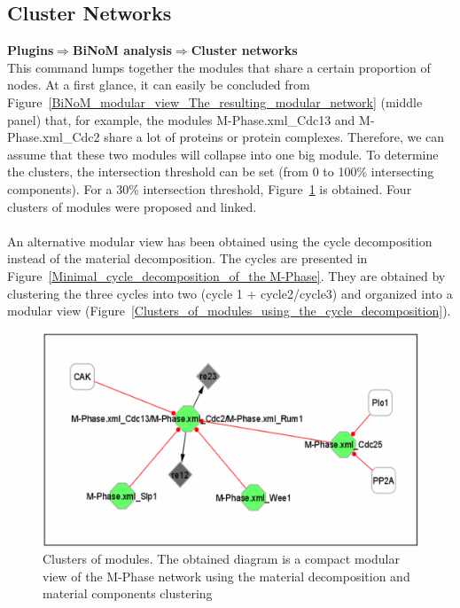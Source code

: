\subsection{Cluster Networks}
\textbf{Plugins$\Rightarrow$BiNoM analysis$\Rightarrow$Cluster networks}\\
This command lumps together the modules that share a certain proportion of nodes. At a first glance, it can easily be concluded from Figure~\ref{BiNoM_modular_view_The_resulting_modular_network} (middle panel) that, for example, the modules M-Phase.xml\_Cdc13 and M-Phase.xml\_Cdc2 share a lot of proteins or protein complexes. Therefore, we can assume that these two modules will collapse into one big module. To determine the clusters, the intersection threshold can be set (from 0 to 100\% intersecting components). For a 30\% intersection threshold, Figure~\ref{Clusters_of_modules_using_the_material_decomposition} is obtained. Four clusters of modules were proposed and linked.\\\\
An alternative modular view has been obtained using the cycle decomposition instead of the material decomposition. The cycles are presented in Figure~\ref{Minimal_cycle_decomposition_of_the M-Phase}. They are obtained by clustering the three cycles into two (cycle 1 + cycle2/cycle3) and organized into a modular view (Figure~\ref{Clusters_of_modules_using_the_cycle_decomposition}).\\
\begin{figure}
\centering
\includegraphics[width=14 cm]{graphics/Clusters_of_modules_using_the_material_decomposition}
\caption{Clusters of modules. The obtained diagram is a compact modular view of the M-Phase network using the material decomposition and material components clustering}
\label{Clusters_of_modules_using_the_material_decomposition}
\end{figure}
